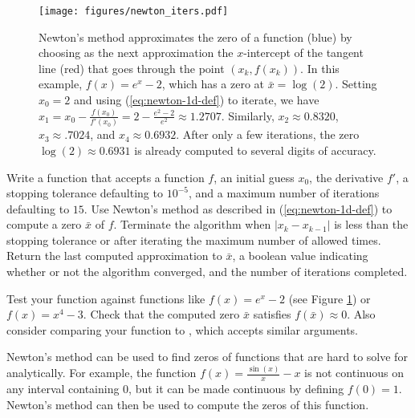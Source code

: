 \begin{figure}[h] %
\centering
\texttt{[image: figures/newton\_iters.pdf]}
\caption{
Newton's method approximates the zero of a function (blue) by choosing as the next approximation the $x$-intercept of the tangent line (red) that goes through the point $(x_k, f(x_k))$.
In this example, $f(x) = e^x - 2$, which has a zero at $\bar{x} = \log(2)$.
Setting $x_0 = 2$ and using (\ref{eq:newton-1d-def}) to iterate, we have $x_1 = x_0 - \frac{f(x_0)}{f'(x_0)} = 2 - \frac{e^2 - 2}{e^2} \approx 1.2707$.
Similarly, $x_2 \approx 0.8320$, $x_3 \approx .7024$, and $x_4 \approx 0.6932$.
After only a few iterations, the zero $\log(2)\approx 0.6931$ is already computed to several digits of accuracy.}
\label{fig:newton}
\end{figure}

\begin{problem}
\label{prob:newton-basic}
Write a function that accepts a function $f$, an initial guess $x_0$, the derivative $f'$, a stopping tolerance defaulting to $10^{-5}$, and a maximum number of iterations defaulting to $15$.
Use Newton's method as described in (\ref{eq:newton-1d-def}) to compute a zero $\bar{x}$ of $f$.
Terminate the algorithm when $|x_k - x_{k-1}|$ is less than the stopping tolerance or after iterating the maximum number of allowed times.
Return the last computed approximation to $\bar{x}$, a boolean value indicating whether or not the algorithm converged, and the number of iterations completed.

Test your function against functions like $f(x) = e^x - 2$ (see Figure \ref{fig:newton}) or $f(x) = x^4 - 3$.
Check that the computed zero $\bar{x}$ satisfies $f(\bar{x}) \approx 0$.
Also consider comparing your function to , which accepts similar arguments.
\end{problem}

\begin{info}
Newton's method can be used to find zeros of functions that are hard to solve for analytically.
For example, the function $f(x) = \frac{\sin(x)}{x}-x$ is not continuous on any interval containing 0, but it can be made continuous by defining $f(0)=1$.
Newton's method can then be used to compute the zeros of this function.
\end{info}

